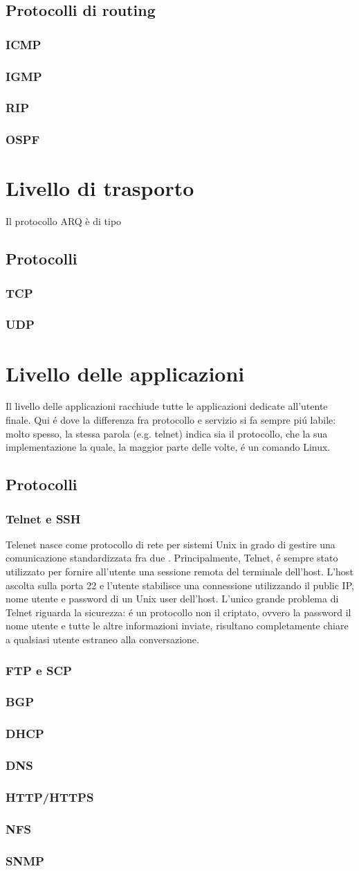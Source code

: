 \documentclass[a4paper,11pt]{article}
\def\sec#1{\section{#1}\label{#1}}
\def\sub#1{\subsection{#1}\label{#1}}
\def\subsub#1{\subsubsection{#1}\label{#1}}
\def\vedi#1{\nameref{#1}}
\begin{document}
\sub{Protocolli di routing}
\subsub{ICMP} 
\subsub{IGMP} 
\subsub{RIP} 
\subsub{OSPF} 

\newpage

\sec{Livello di trasporto}

Il protocollo ARQ è di tipo \vedi{Full-Duplex} %

\subsection{Protocolli} 
\subsub{TCP} 
\subsub{UDP} 
\newpage

\sec{Livello delle applicazioni}
Il livello delle applicazioni racchiude tutte le applicazioni dedicate all'utente finale. 
Qui \'e dove la differenza fra protocollo e servizio si fa sempre pi\'u labile: molto spesso, la stessa parola (e.g. telnet) indica sia il protocollo, che la sua implementazione la quale, la maggior parte delle volte, \'e un comando Linux. 
\subsection{Protocolli}
\subsub{Telnet e SSH} %
Telenet nasce come protocollo di rete per sistemi Unix in grado di gestire una comunicazione standardizzata fra due \vedi{DTE}. Principalmente, Telnet, \'e sempre stato utilizzato per fornire all'utente una sessione remota del terminale dell'host. L'host ascolta sulla porta 22 e l'utente stabilisce una connessione utilizzando il public IP, nome utente e password di un Unix user dell'host. L'unico grande problema di Telnet riguarda la sicurezza: \'e un protocollo non il criptato, ovvero la password il nome utente e tutte le altre informazioni inviate, risultano completamente chiare a qualsiasi utente estraneo alla conversazione.
\subsub{FTP e SCP} %
\subsub{BGP} 
\subsub{DHCP} %
\subsub{DNS} 
\subsub{HTTP/HTTPS} 
\subsub{NFS}
\subsub{SNMP} %
\end{document}
